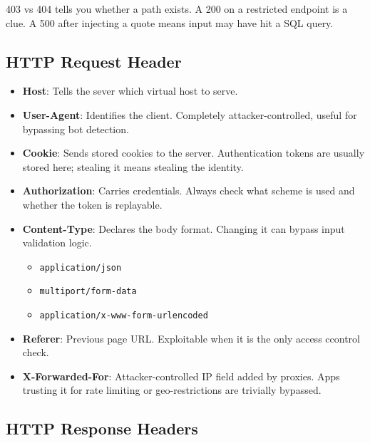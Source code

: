 \documentclass[12pt, letterpaper]{article}
\begin{document}
403 vs 404 tells you whether a path exists. A 200 on a restricted endpoint is a clue. A 500 after injecting a quote means input may have hit a SQL query.

\subsection*{HTTP Request Header}

\begin{itemize}
    \item \textbf{Host}: Tells the sever which virtual host to serve.
    \item \textbf{User-Agent}: Identifies the client. Completely attacker-controlled, useful for bypassing bot detection.
    \item \textbf{Cookie}: Sends stored cookies to the server. Authentication tokens are usually stored here; stealing it means stealing the identity.
    \item \textbf{Authorization}: Carries credentials. Always check what scheme is used and whether the token is replayable.
    \item \textbf{Content-Type}: Declares the body format. Changing it can bypass input validation logic.
        \begin{itemize}
            \item \texttt{application/json}
            \item \texttt{multiport/form-data}
            \item \texttt{application/x-www-form-urlencoded}
        \end{itemize}
    \item \textbf{Referer}: Previous page URL. Exploitable when it is the only access ccontrol check.
    \item \textbf{X-Forwarded-For}: Attacker-controlled IP field added by proxies. Apps trusting it for rate limiting or geo-restrictions are trivially bypassed.
\end{itemize}

\subsection*{HTTP Response Headers}
\end{document}
